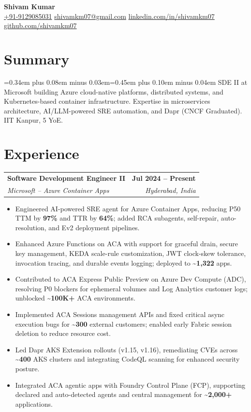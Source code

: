 \documentclass[a4paper,9pt]{extarticle}
\makeatletter
\newcommand{\resumeTextSpacing}{\setlength{\baselineskip}{11.0pt}\spaceskip=0.34em plus 0.08em minus 0.03em\xspaceskip=0.45em plus 0.10em minus 0.04em}
\newcommand{\contactSep}{\hspace{0.5em}{\color{rulegray}|}\hspace{0.5em}}
\newcommand{\resumeSubheading}[4]{
  \vspace{2pt}
  \begin{tabularx}{\textwidth}{@{}Xr@{}}
    \textbf{\color{textgray}#1} & \textbf{\small #2} \\
    {\small\textit{#3}} & {\small\textit{#4}} \\
  \end{tabularx}
  \vspace{-4pt}
}
\newcommand{\resumeItemPlain}[1]{\item #1}
\newenvironment{resumeItemList}{
  \begin{itemize}[
    leftmargin=0.18in,
    label={\color{accent}\bfseries--},
    itemsep=0.4pt,
    topsep=1.0pt,
    parsep=0pt,
    partopsep=0pt
  ]\resumeTextSpacing
}{
  \end{itemize}\vspace{0pt}
}
\makeatother
\begin{document}
\begin{center}
  {\Huge\bfseries\color{accent} Shivam Kumar}\\[5pt]
  \small
  \href{tel:+919129085031}{+91-9129085031}
  \contactSep
  \href{mailto:shivamkm07@gmail.com}{shivamkm07@gmail.com}
  \contactSep
  \href{https://www.linkedin.com/in/shivamkm07}{linkedin.com/in/shivamkm07}
  \contactSep
  \href{https://github.com/shivamkm07}{github.com/shivamkm07}
\end{center}
\vspace{-3pt}

\section{Summary}
\resumeTextSpacing
SDE II at Microsoft building Azure cloud-native platforms, distributed systems, and Kubernetes-based container infrastructure. Expertise in microservices architecture, AI/LLM-powered SRE automation, and Dapr (CNCF Graduated). IIT Kanpur, 5 YoE.

\section{Experience}

\resumeSubheading
  {Software Development Engineer II}{Jul 2024 -- Present}
  {Microsoft -- Azure Container Apps}{Hyderabad, India}
\begin{resumeItemList}
  \resumeItemPlain{Engineered AI-powered SRE agent for Azure Container Apps, reducing P50 TTM by \textbf{97\%} and TTR by \textbf{64\%}; added RCA subagents, self-repair, auto-resolution, and Ev2 deployment pipelines.}
  \resumeItemPlain{Enhanced Azure Functions on ACA with support for graceful drain, secure key management, KEDA scale-rule customization, JWT clock-skew tolerance, invocation tracing, and durable events logging; deployed to \textbf{\textasciitilde{}1,322} apps.}
  \resumeItemPlain{Contributed to ACA Express Public Preview on Azure Dev Compute (ADC), resolving P0 blockers for ephemeral volumes and Log Analytics customer logs; unblocked \textbf{\textasciitilde{}100K+} ACA environments.}
  \resumeItemPlain{Implemented ACA Sessions management APIs and fixed critical async execution bugs for \textbf{\textasciitilde{}300} external customers; enabled early Fabric session deletion to reduce resource cost.}
  \resumeItemPlain{Led Dapr AKS Extension rollouts (v1.15, v1.16), remediating CVEs across \textbf{\textasciitilde{}400} AKS clusters and integrating CodeQL scanning for enhanced security posture.}
  \resumeItemPlain{Integrated ACA agentic apps with Foundry Control Plane (FCP), supporting declared and auto-detected agents and central management for \textbf{\textasciitilde{}2,000+} applications.}
\end{resumeItemList}
\end{document}
